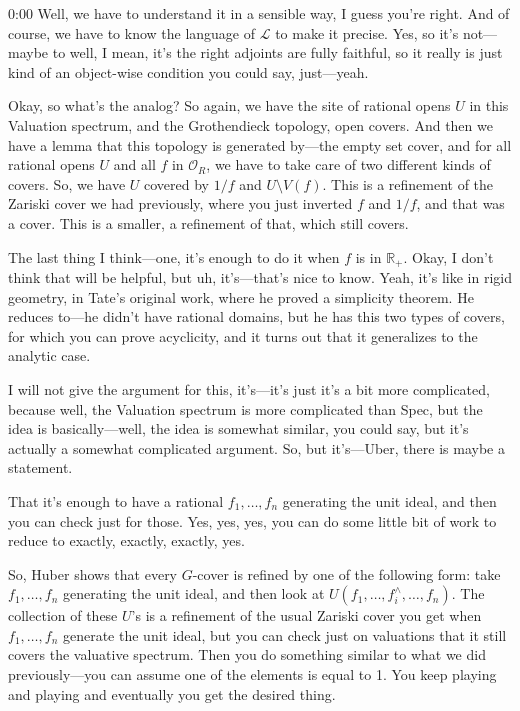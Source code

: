 \begin{unfinished}{0:00}
Well, we have to understand it in a sensible way, I guess you're right. And of course, we have to know the language of $\mathcal{L}$ to make it precise. Yes, so it's not---maybe to well, I mean, it's the right adjoints are fully faithful, so it really is just kind of an object-wise condition you could say, just---yeah.

Okay, so what's the analog? So again, we have the site of rational opens $U$ in this Valuation spectrum, and the Grothendieck topology, open covers. And then we have a lemma that this topology is generated by---the empty set cover, and for all rational opens $U$ and all $f$ in $\mathcal{O}_R$, we have to take care of two different kinds of covers. So, we have $U$ covered by $1/f$ and $U \setminus V(f)$. This is a refinement of the Zariski cover we had previously, where you just inverted $f$ and $1/f$, and that was a cover. This is a smaller, a refinement of that, which still covers.

The last thing I think---one, it's enough to do it when $f$ is in $\mathbb{R}_+$. Okay, I don't think that will be helpful, but uh, it's---that's nice to know. Yeah, it's like in rigid geometry, in Tate's original work, where he proved a simplicity theorem. He reduces to---he didn't have rational domains, but he has this two types of covers, for which you can prove acyclicity, and it turns out that it generalizes to the analytic case.

I will not give the argument for this, it's---it's just it's a bit more complicated, because well, the Valuation spectrum is more complicated than Spec, but the idea is basically---well, the idea is somewhat similar, you could say, but it's actually a somewhat complicated argument. So, but it's---Uber, there is maybe a statement.

That it's enough to have a rational $f_1, \dots, f_n$ generating the unit ideal, and then you can check just for those. Yes, yes, yes, you can do some little bit of work to reduce to exactly, exactly, exactly, yes.

So, Huber shows that every $G$-cover is refined by one of the following form: take $f_1, \dots, f_n$ generating the unit ideal, and then look at $U(f_1, \dots, f_i^\wedge, \dots, f_n)$. The collection of these $U$'s is a refinement of the usual Zariski cover you get when $f_1, \dots, f_n$ generate the unit ideal, but you can check just on valuations that it still covers the valuative spectrum. Then you do something similar to what we did previously---you can assume one of the elements is equal to 1. You keep playing and playing and eventually you get the desired thing.


\end{unfinished}
